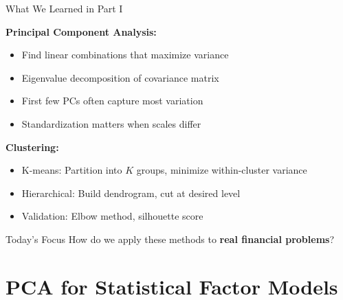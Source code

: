 \documentclass[10pt]{beamer}
\newcommand{\highlight}[1]{\textcolor{AccentOrange}{\textbf{#1}}}
\begin{document}
\begin{frame}{What We Learned in Part I}

  \textbf{Principal Component Analysis:}
  \begin{itemize}
    \item Find linear combinations that maximize variance
    \item Eigenvalue decomposition of covariance matrix
    \item First few PCs often capture most variation
    \item Standardization matters when scales differ
  \end{itemize}

  \vspace{1em}
  \textbf{Clustering:}
  \begin{itemize}
    \item K-means: Partition into $K$ groups, minimize within-cluster variance
    \item Hierarchical: Build dendrogram, cut at desired level
    \item Validation: Elbow method, silhouette score
  \end{itemize}

  \vspace{1em}
  \begin{block}{Today's Focus}
    How do we apply these methods to \highlight{real financial problems}?
  \end{block}
\end{frame}

\section{PCA for Statistical Factor Models}
\end{document}

